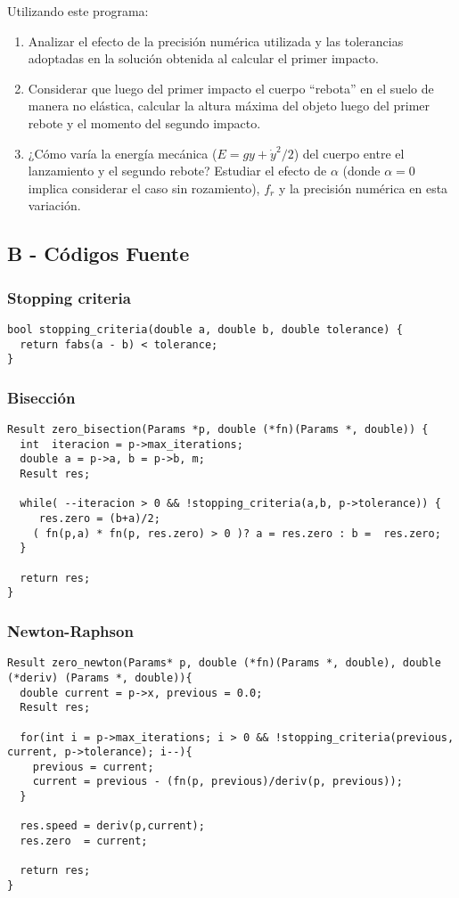 \documentclass[a4paper]{article}
\begin{document}
Utilizando este programa:
\begin{enumerate}
  \item Analizar el efecto de la precisión numérica utilizada y las tolerancias adoptadas en la solución obtenida al calcular el primer impacto.
  
  \item Considerar que luego del primer impacto el cuerpo ``rebota'' en el suelo de manera no elástica, calcular la altura máxima del objeto luego del primer rebote y el momento del segundo impacto.

  \item ¿Cómo varía la energía mecánica ($E = g y +\dot{y}^2/2$) del cuerpo entre el lanzamiento y el segundo rebote? Estudiar el efecto de $\alpha$ (donde $\alpha = 0$ implica considerar el caso sin rozamiento), $f_r$ y la precisión numérica en esta variación.
\end{enumerate}

\subsection{B - Códigos Fuente}

\subsubsection{Stopping criteria}
\begin{verbatim}
bool stopping_criteria(double a, double b, double tolerance) {
  return fabs(a - b) < tolerance;
}
\end{verbatim}

\subsubsection{Bisección}
\begin{verbatim}
Result zero_bisection(Params *p, double (*fn)(Params *, double)) {
  int  iteracion = p->max_iterations;
  double a = p->a, b = p->b, m;
  Result res;

  while( --iteracion > 0 && !stopping_criteria(a,b, p->tolerance)) {
     res.zero = (b+a)/2;
    ( fn(p,a) * fn(p, res.zero) > 0 )? a = res.zero : b =  res.zero;
  }

  return res;
}
\end{verbatim}


\subsubsection{Newton-Raphson}
\begin{verbatim}
Result zero_newton(Params* p, double (*fn)(Params *, double), double (*deriv) (Params *, double)){
  double current = p->x, previous = 0.0;
  Result res;

  for(int i = p->max_iterations; i > 0 && !stopping_criteria(previous, current, p->tolerance); i--){
    previous = current;
    current = previous - (fn(p, previous)/deriv(p, previous));
  }

  res.speed = deriv(p,current);
  res.zero  = current;

  return res;
}
\end{verbatim}
\end{document}
